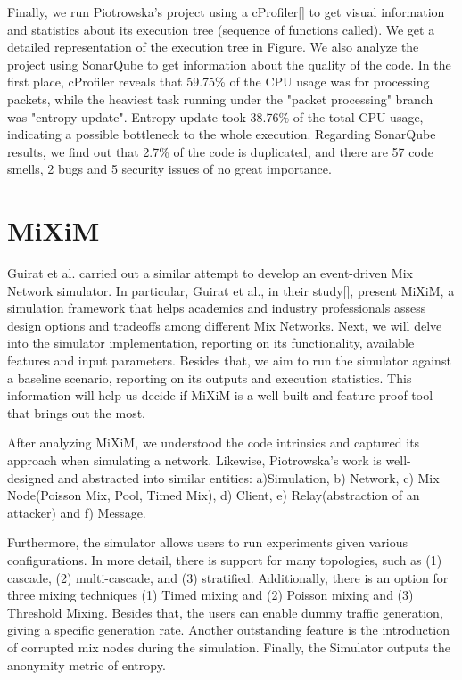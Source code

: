 \documentclass[logo,msc,cyber]{infthesis}   %
\begin{document}
Finally, we run Piotrowska's project using a cProfiler[] to get visual
information and statistics about its execution tree (sequence of functions
called). We get a detailed representation of the execution tree in Figure. We
also analyze the project using SonarQube to get information about the quality of
the code. In the first place, cProfiler reveals that 59.75\% of the CPU usage was
for processing packets, while the heaviest task running under the "packet
processing" branch was "entropy update". Entropy update took 38.76\% of the total
CPU usage, indicating a possible bottleneck to the whole execution. Regarding
SonarQube results, we find out that 2.7\% of the code is duplicated, and there
are 57 code smells, 2 bugs and 5 security issues of no great importance.

\section{MiXiM}

Guirat et al. carried out a similar attempt to develop an event-driven Mix
Network simulator. In particular, Guirat et al., in their study[], present
MiXiM, a simulation framework that helps academics and industry professionals
assess design options and tradeoffs among different Mix Networks. Next, we will
delve into the simulator implementation, reporting on its functionality,
available features and input parameters. Besides that, we aim to run the
simulator against a baseline scenario, reporting on its outputs and execution
statistics. This information will help us decide if MiXiM is a well-built and
feature-proof tool that brings out the most.

After analyzing MiXiM, we understood the code intrinsics and captured its
approach when simulating a network. Likewise, Piotrowska's work is well-designed
and abstracted into similar entities: a)Simulation, b) Network, c) Mix
Node(Poisson Mix, Pool, Timed Mix), d) Client, e) Relay(abstraction of an
attacker) and f) Message.

Furthermore, the simulator allows users to run experiments given various
configurations. In more detail, there is support for many topologies, such as
(1) cascade, (2) multi-cascade, and (3) stratified. Additionally, there is an
option for three mixing techniques (1) Timed mixing and (2) Poisson mixing and
(3) Threshold Mixing. Besides that, the users can enable dummy traffic
generation, giving a specific generation rate. Another outstanding feature is
the introduction of corrupted mix nodes during the simulation. Finally, the
Simulator outputs the anonymity metric of entropy.
\end{document}

